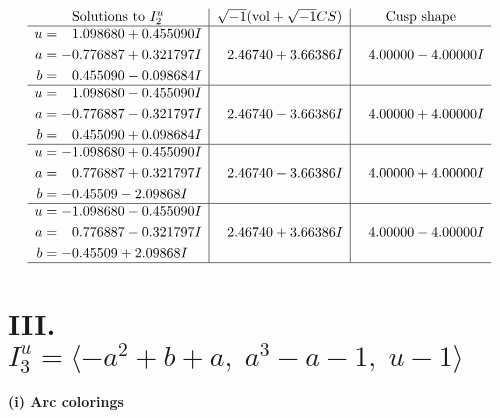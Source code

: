 \documentclass[1p]{elsarticle_modified}
\theoremstyle{definition}
\newcommand{\I}{\sqrt{-1}}
\begin{document}
$$\begin{array}{c|c|c}  
\text{Solutions to }I^u_{2}& \I (\text{vol} + \sqrt{-1}CS) & \text{Cusp shape}\\
 \hline 
\begin{aligned}
u &= \phantom{-}1.098680 + 0.455090 I \\
a &= -0.776887 + 0.321797 I \\
b &= \phantom{-}0.455090 - 0.098684 I\end{aligned}
 & \phantom{-}2.46740 + 3.66386 I & \phantom{-}4.00000 - 4.00000 I \\ \hline\begin{aligned}
u &= \phantom{-}1.098680 - 0.455090 I \\
a &= -0.776887 - 0.321797 I \\
b &= \phantom{-}0.455090 + 0.098684 I\end{aligned}
 & \phantom{-}2.46740 - 3.66386 I & \phantom{-}4.00000 + 4.00000 I \\ \hline\begin{aligned}
u &= -1.098680 + 0.455090 I \\
a &= \phantom{-}0.776887 + 0.321797 I \\
b &= -0.45509 - 2.09868 I\end{aligned}
 & \phantom{-}2.46740 - 3.66386 I & \phantom{-}4.00000 + 4.00000 I \\ \hline\begin{aligned}
u &= -1.098680 - 0.455090 I \\
a &= \phantom{-}0.776887 - 0.321797 I \\
b &= -0.45509 + 2.09868 I\end{aligned}
 & \phantom{-}2.46740 + 3.66386 I & \phantom{-}4.00000 - 4.00000 I\\
 \hline 
 \end{array}$$\newpage\newpage\renewcommand{\arraystretch}{1}
\centering \section*{III. $I^u_{3}= \langle - a^2+b+a,\;a^3- a-1,\;u-1 \rangle$}
\flushleft \textbf{(i) Arc colorings}\\
\end{document}
